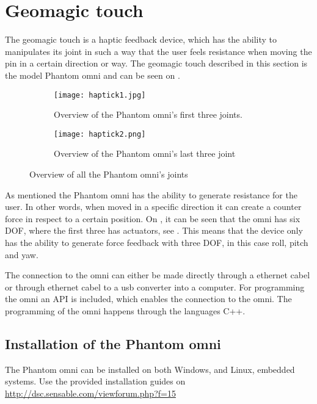 \section{Geomagic touch}\label{sec:geo_magic}
The geomagic touch is a haptic feedback device, which has the ability to manipulates its joint in such a way that the user feels resistance when moving the pin in a certain direction or way. The geomagic touch described in this section is the model Phantom omni and can be seen on .

\begin{figure}[H]
	\centering
	\begin{subfigure}{.45\textwidth}
		\centering
		\texttt{[image: haptick1.jpg]}
		\caption{Overview of the Phantom omni's first three joints.}
		\label{fig:phantom1}
	\end{subfigure}
	\begin{subfigure}{.45\textwidth}
		\centering
		\texttt{[image: haptick2.png]}
		\caption{Overview of the Phantom omni's last three joint}
		\label{fig:phantom2}
	\end{subfigure}
\caption{Overview of all the Phantom omni's joints\citep{phantom_omni}}
\label{fig:phantom_omni}
\end{figure}

As mentioned the Phantom omni has the ability to generate resistance for the user. In other words, when moved in a specific direction it can create a counter force in respect to a certain position. On , it can be seen that the omni has six \gls{DOF}, where the first three has actuators, see . This means that the device only has the ability to generate force feedback with three \gls{DOF}, in this case roll, pitch and yaw.

The connection to the omni can either be made directly through a ethernet cabel or through ethernet cabel to a usb converter into a computer. For programming the omni an API is included, which enables the connection to the omni. The programming of the omni happens through the languages C++. 

\subsection*{Installation of the Phantom omni}

The Phantom omni can be installed on both Windows, and Linux, embedded systems. 
Use the provided installation guides on\\
\url{http://dsc.sensable.com/viewforum.php?f=15}

